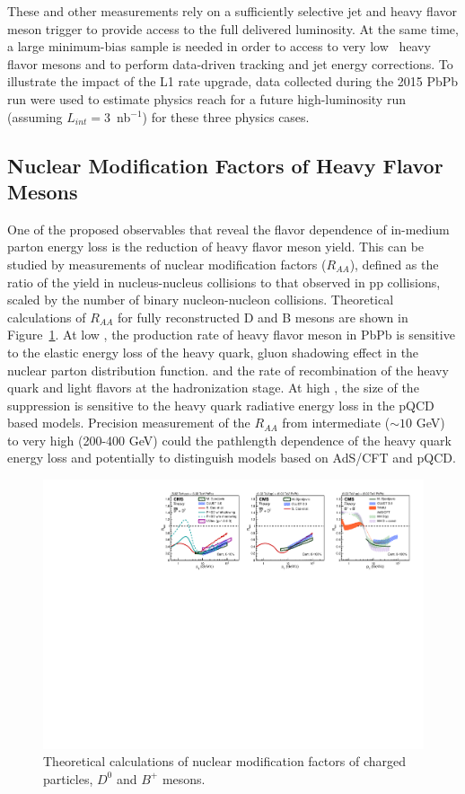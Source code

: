 These and other measurements rely on a sufficiently selective jet and heavy flavor meson trigger to provide access to the full delivered luminosity. At the same time, a large minimum-bias sample is needed in order to access to very low \pt\ heavy flavor mesons and to perform data-driven tracking and jet energy corrections.  To illustrate the impact of the L1 rate upgrade, data collected during the 2015 PbPb run were used to estimate physics reach for a future high-luminosity run (assuming $L_{int} =$3~nb$^{-1}$) for these three physics cases. 


\subsection{Nuclear Modification Factors of Heavy Flavor Mesons}

One of the proposed observables that reveal the flavor dependence of in-medium parton energy loss is the reduction of heavy flavor meson yield. This can be studied by measurements of nuclear modification factors ($R_{AA}$), defined as the ratio of the yield in nucleus-nucleus collisions to that observed in pp collisions, scaled by the number of binary nucleon-nucleon collisions. Theoretical calculations of $R_{AA}$ for fully reconstructed D and B mesons are shown in Figure~\ref{fig:RAA_theory}. At low \pt, the production rate of heavy flavor meson in PbPb is sensitive to the elastic energy loss of the heavy quark, gluon shadowing effect in the nuclear parton distribution function. and the rate of recombination of the heavy quark and light flavors at the hadronization stage. At high \pt, the size of the suppression is sensitive to the heavy quark radiative energy loss in the pQCD based models. Precision measurement of the $R_{AA}$ from intermediate \pt ($\sim 10$ GeV) to very high \pt (200-400 GeV) could the pathlength dependence of the heavy quark energy loss and potentially to distinguish models based on AdS/CFT and pQCD. 

\begin{figure}[!ht]
\begin{center}
\includegraphics[width=.98\textwidth]{figures/cTheoryRAA_BD_v1.pdf}
\caption{Theoretical calculations of nuclear modification factors of charged particles, $D^0$ and $B^+$ mesons.}
\label{fig:RAA_theory}
\end{center}
\end{figure}

